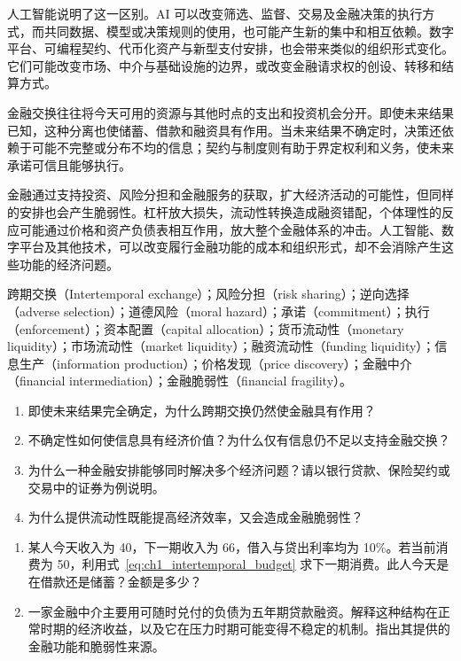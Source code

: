 人工智能说明了这一区别。AI 可以改变筛选、监督、交易及金融决策的执行方式，而共同数据、模型或决策规则的使用，也可能产生新的集中和相互依赖。数字平台、可编程契约、代币化资产与新型支付安排，也会带来类似的组织形式变化。它们可能改变市场、中介与基础设施的边界，或改变金融请求权的创设、转移和结算方式。


金融交换往往将今天可用的资源与其他时点的支出和投资机会分开。即使未来结果已知，这种分离也使储蓄、借款和融资具有作用。当未来结果不确定时，决策还依赖于可能不完整或分布不均的信息；契约与制度则有助于界定权利和义务，使未来承诺可信且能够执行。

金融通过支持投资、风险分担和金融服务的获取，扩大经济活动的可能性，但同样的安排也会产生脆弱性。杠杆放大损失，流动性转换造成融资错配，个体理性的反应可能通过价格和资产负债表相互作用，放大整个金融体系的冲击。人工智能、数字平台及其他技术，可以改变履行金融功能的成本和组织形式，却不会消除产生这些功能的经济问题。


跨期交换（Intertemporal exchange）；风险分担（risk sharing）；逆向选择（adverse selection）；道德风险（moral hazard）；承诺（commitment）；执行（enforcement）；资本配置（capital allocation）；货币流动性（monetary liquidity）；市场流动性（market liquidity）；融资流动性（funding liquidity）；信息生产（information production）；价格发现（price discovery）；金融中介（financial intermediation）；金融脆弱性（financial fragility）。





\begin{enumerate}
\item 即使未来结果完全确定，为什么跨期交换仍然使金融具有作用？
\item 不确定性如何使信息具有经济价值？为什么仅有信息仍不足以支持金融交换？
\item 为什么一种金融安排能够同时解决多个经济问题？请以银行贷款、保险契约或交易中的证券为例说明。
\item 为什么提供流动性既能提高经济效率，又会造成金融脆弱性？
\end{enumerate}


\begin{enumerate}
\item 某人今天收入为 40，下一期收入为 66，借入与贷出利率均为 10\%。若当前消费为 50，利用式~\eqref{eq:ch1_intertemporal_budget} 求下一期消费。此人今天是在借款还是储蓄？金额是多少？

\item 一家金融中介主要用可随时兑付的负债为五年期贷款融资。解释这种结构在正常时期的经济收益，以及它在压力时期可能变得不稳定的机制。指出其提供的金融功能和脆弱性来源。
\end{enumerate}


